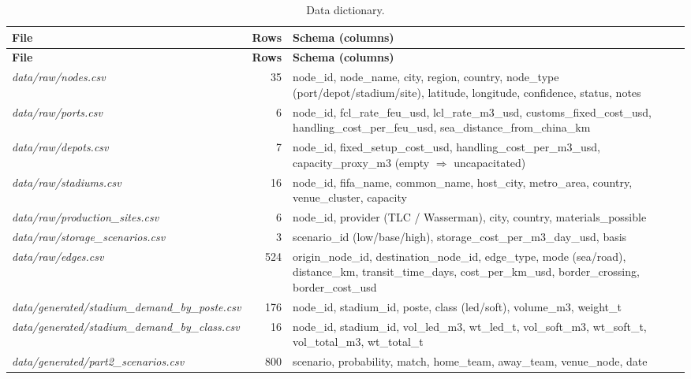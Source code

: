 \documentclass[11pt,a4paper]{article}
\numberwithin{equation}{section}
\newcommand{\filename}[1]{\textit{\small #1}}
\begin{document}
\begin{longtable}{@{}p{}r p{}@{}}
\caption{Data dictionary.\label{tab:csvs}}\\
\toprule
\textbf{File} & \textbf{Rows} & \textbf{Schema (columns)}\\
\midrule
\endfirsthead
\toprule
\textbf{File} & \textbf{Rows} & \textbf{Schema (columns)}\\
\midrule
\endhead
\bottomrule
\endlastfoot
\filename{data/raw/nodes.csv}            & 35  & node\_id, node\_name, city, region, country, node\_type (port/depot/stadium/site), latitude, longitude, confidence, status, notes \\
\filename{data/raw/ports.csv}            &  6  & node\_id, fcl\_rate\_feu\_usd, lcl\_rate\_m3\_usd, customs\_fixed\_cost\_usd, handling\_cost\_per\_feu\_usd, sea\_distance\_from\_china\_km \\
\filename{data/raw/depots.csv}           &  7  & node\_id, fixed\_setup\_cost\_usd, handling\_cost\_per\_m3\_usd, capacity\_proxy\_m3 (empty $\Rightarrow$ uncapacitated) \\
\filename{data/raw/stadiums.csv}         & 16  & node\_id, fifa\_name, common\_name, host\_city, metro\_area, country, venue\_cluster, capacity \\
\filename{data/raw/production\_sites.csv} & 6  & node\_id, provider (TLC / Wasserman), city, country, materials\_possible \\
\filename{data/raw/storage\_scenarios.csv} & 3 & scenario\_id (low/base/high), storage\_cost\_per\_m3\_day\_usd, basis \\
\filename{data/raw/edges.csv}             & 524 & origin\_node\_id, destination\_node\_id, edge\_type, mode (sea/road), distance\_km, transit\_time\_days, cost\_per\_km\_usd, border\_crossing, border\_cost\_usd \\
\filename{data/generated/stadium\_demand\_by\_poste.csv} & 176 & node\_id, stadium\_id, poste, class (led/soft), volume\_m3, weight\_t \\
\filename{data/generated/stadium\_demand\_by\_class.csv} & 16 & node\_id, stadium\_id, vol\_led\_m3, wt\_led\_t, vol\_soft\_m3, wt\_soft\_t, vol\_total\_m3, wt\_total\_t \\
\filename{data/generated/part2\_scenarios.csv} & 800 & scenario, probability, match, home\_team, away\_team, venue\_node, date \\
\end{longtable}

\end{document}

